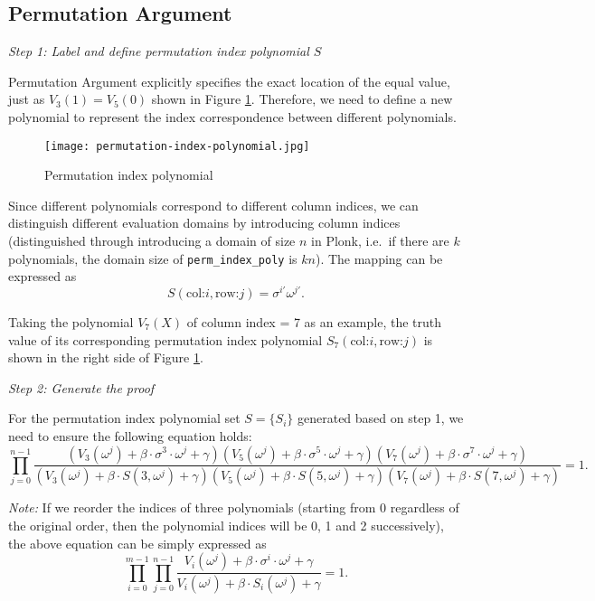 \subsection{Permutation Argument}

\emph{Step 1: Label and define permutation index polynomial $S$}

Permutation Argument explicitly specifies the exact location of the equal value, just as $V_3(1) = V_5(0)$ shown in Figure \ref{fig:permutation-index-polynomial}. Therefore, we need to define a new polynomial to represent the index correspondence between different polynomials.

\begin{figure}[!ht]
    \centering
    \texttt{[image: permutation-index-polynomial.jpg]}
    \caption{Permutation index polynomial}
    \label{fig:permutation-index-polynomial}
\end{figure}

Since different polynomials correspond to different column indices, we can distinguish different evaluation domains by introducing column indices (distinguished through introducing a domain of size $n$ in Plonk, i.e.\ if there are $k$ polynomials, the domain size of \verb|perm_index_poly| is $kn$). The mapping can be expressed as
\[ S(\text{col:}i, \text{row:}j)=\sigma^{i'} \omega^{j'}. \]

Taking the polynomial $V_7(X)$ of column index = 7 as an example, the truth value of its corresponding permutation index polynomial $S_7(\text{col:}i, \text{row:}j)$ is shown in the right side of Figure \ref{fig:permutation-index-polynomial}.

\emph{Step 2: Generate the proof}

For the permutation index polynomial set $S = \{S_i\}$ generated based on step 1, we need to ensure the following equation holds:
\[
    \prod_{j=0}^{n-1} \frac{\left(V_3(\omega^j)+\beta \cdot \sigma^3 \cdot \omega^j+\gamma\right) \left(V_5(\omega^j)+\beta \cdot \sigma^5 \cdot \omega^j+\gamma\right) \left(V_7(\omega^j)+\beta \cdot \sigma^7 \cdot \omega^j+\gamma\right)} {\left(V_3(\omega^j)+\beta \cdot S(3, \omega^j)+\gamma\right) \left(V_5(\omega^j)+\beta \cdot S(5,\omega^{j})+\gamma\right) \left(V_7(\omega^j)+\beta \cdot S(7,\omega^{j})+\gamma\right)} = 1.
\]

\emph{Note:} If we reorder the indices of three polynomials (starting from 0 regardless of the original order, then the polynomial indices will be 0, 1 and 2 successively), the above equation can be simply expressed as
\[ \prod_{i=0}^{m-1} \prod_{j=0}^{n-1} \frac{V_i(\omega^j)+\beta \cdot \sigma^i \cdot \omega^j+\gamma}{V_i(\omega^j)+\beta \cdot S_i(\omega^j)+\gamma}=1. \]

